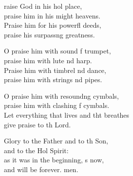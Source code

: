 \settowidth{\versewidth}{Let everything that lives and that breathes *}
\begin{psalmverse}%
  \begin{patverse}
raise God in his hol place,\Med\\
praise him in his might heavens.\\
Praise him for his powerfl deeds,\Med\\
praise his surpass\pointup{\i}ng greatness.

O praise him with sound f trumpet,\Med\\
praise him with lute nd harp.\\
Praise him with timbrel nd dance,\Med\\
praise him with strings nd pipes.

O praise him with resound\pointup{\i}ng cymbals,\Med\\
praise him with clashing f cymbals.\\
Let everything that lives and tht breathes\Med\\
give praise to th Lord.

Glory to the Father and to th Son,\Med\\
and to the Hol Spirit:\\
as it was in the beginning, \pointup{\i}s now,\Med\\
and will be forever. men. 
  \end{patverse}
\end{psalmverse}
